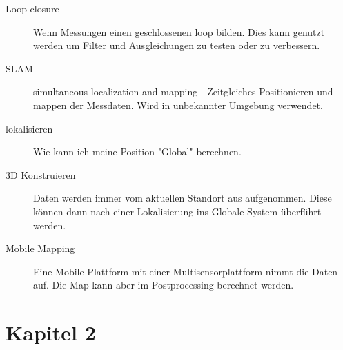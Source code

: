 \begin{description}
	\item[Loop closure] Wenn Messungen einen geschlossenen loop bilden. Dies kann genutzt werden um Filter und Ausgleichungen zu testen oder zu verbessern.
	\item[SLAM] simultaneous localization and mapping - Zeitgleiches Positionieren und mappen der Messdaten. Wird in unbekannter Umgebung verwendet.
	\item[lokalisieren] Wie kann ich meine Position "Global" berechnen.
	\item[3D Konstruieren] Daten werden immer vom aktuellen Standort aus aufgenommen. Diese können dann nach einer Lokalisierung ins Globale System überführt werden.
	\item[Mobile Mapping] Eine Mobile Plattform mit einer Multisensorplattform nimmt die Daten auf. Die Map kann aber im Postprocessing berechnet werden.
\end{description}

\section{Kapitel 2}
\label{sec:faq:kap2}

